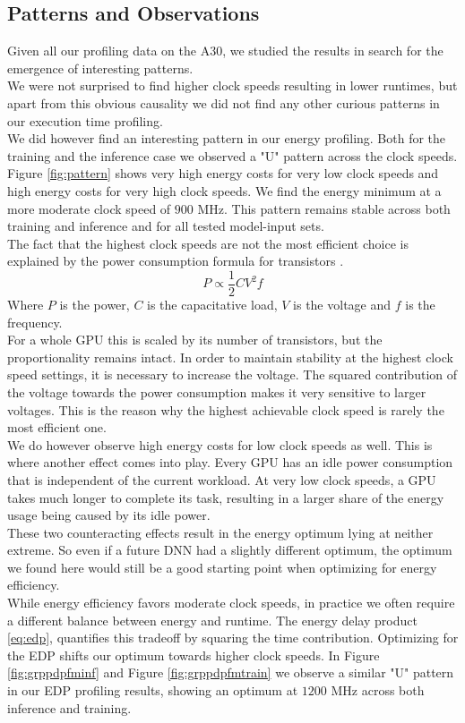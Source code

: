 \subsection{Patterns and Observations}
Given all our profiling data on the A30, we studied the results in search for the emergence of interesting patterns. \\
We were not surprised to find higher clock speeds resulting in lower runtimes, but apart from this obvious causality we did not find any other curious patterns in our execution time profiling. \\
We did however find an interesting pattern in our energy profiling. Both for the training and the inference case we observed a "U" pattern across the clock speeds. Figure \ref{fig:pattern} shows very high energy costs for very low clock speeds and high energy costs for very high clock speeds. We find the energy minimum at a more moderate clock speed of $900$ MHz. This pattern remains stable across both training and inference and for all tested model-input sets. \\
The fact that the highest clock speeds are not the most efficient choice is explained by the power consumption formula for transistors \cite{hennessy2017computer}. 
\begin{equation}
    P \propto \frac{1}{2} C V^2 f
\end{equation}
Where $P$ is the power, $C$ is the capacitative load, $V$ is the voltage and $f$ is the frequency. \\
For a whole GPU this is scaled by its number of transistors, but the proportionality remains intact. In order to maintain stability at the highest clock speed settings, it is necessary to increase the voltage. The squared contribution of the voltage towards the power consumption makes it very sensitive to larger voltages. This is the reason why the highest achievable clock speed is rarely the most efficient one. \\
We do however observe high energy costs for low clock speeds as well. This is where another effect comes into play. Every GPU has an idle power consumption that is independent of the current workload. At very low clock speeds, a GPU takes much longer to complete its task, resulting in a larger share of the energy usage being caused by its idle power. \\
These two counteracting effects result in the energy optimum lying at neither extreme. So even if a future DNN had a slightly different optimum, the optimum we found here would still be a good starting point when optimizing for energy efficiency.\\
While energy efficiency favors moderate clock speeds, in practice we often require a different balance between energy and runtime. The energy delay product \ref{eq:edp}, quantifies this tradeoff by squaring the time contribution. Optimizing for the EDP shifts our optimum towards higher clock speeds. In Figure \ref{fig:grppdpfminf} and Figure \ref{fig:grppdpfmtrain} we observe a similar "U" pattern in our EDP profiling results, showing an optimum at $1200$ MHz across both inference and training.


